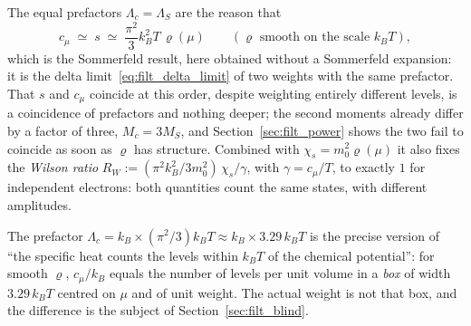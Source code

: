 \documentclass[10pt,a4paper]{article}
\theoremstyle{plain}
\theoremstyle{remark}
\begin{document}
The equal prefactors $ \Lambda_c = \Lambda_S $ are the reason that
\begin{equation}\label{eq:filt_sommerfeld}
c_\mu\;\simeq\;s\;\simeq\;\frac{\pi^{2}}{3}k_B^{2}T\,\varrho(\mu)
\qquad(\varrho\text{ smooth on the scale }k_BT),
\end{equation}
which is the Sommerfeld result, here obtained without a Sommerfeld expansion: it is
the delta limit~\eqref{eq:filt_delta_limit} of two weights with the same
prefactor. That $s$ and $c_\mu$ coincide at this order, despite weighting entirely
different levels, is a coincidence of prefactors and nothing deeper; the second
moments already differ by a factor of three, $ M_c = 3M_S $, and
Section~\ref{sec:filt_power} shows the two fail to coincide as soon as $\varrho$ has
structure. Combined with $ \chi_s = m_0^{2}\varrho(\mu) $ it also fixes the
\emph{Wilson ratio} $ R_W := (\pi^{2}k_B^{2}/3m_0^{2})\,\chi_s/\gamma $, with
$ \gamma = c_\mu/T $, to exactly $ 1 $ for independent electrons: both quantities
count the same states, with different amplitudes.

The prefactor $ \Lambda_c = k_B\times(\pi^{2}/3)k_BT \approx k_B\times3.29\,k_BT $ is
the precise version of ``the specific heat counts the levels within $k_BT$ of the
chemical potential'': for smooth $ \varrho $, $c_\mu/k_B$ equals the number of levels
per unit volume in a \emph{box} of width $3.29\,k_BT$ centred on $\mu$ and of unit
weight. The actual weight is not that box, and the difference is the subject of
Section~\ref{sec:filt_blind}.
\end{document}
